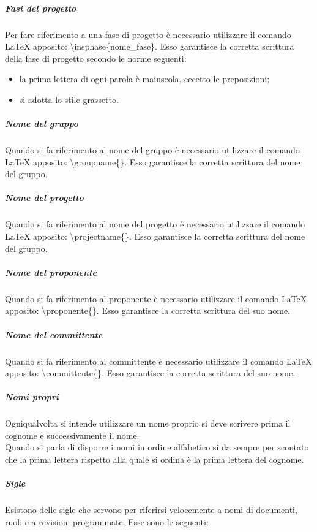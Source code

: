 				\subparagraph{Fasi del progetto}
					Per fare riferimento a una fase di progetto è necessario utilizzare il comando \LaTeX{} apposito: \textbackslash insphase\{nome\_fase\}. Esso garantisce la corretta scrittura della fase di progetto secondo le norme seguenti:
					\begin{itemize}
						\item la prima lettera di ogni parola è maiuscola, eccetto le preposizioni;
						\item si adotta lo stile grassetto.
					\end{itemize}
				\subparagraph{Nome del gruppo}
					Quando si fa riferimento al nome del gruppo è necessario utilizzare il comando \LaTeX{} apposito: \textbackslash groupname\{\}. Esso garantisce la corretta scrittura del nome del gruppo.
				\subparagraph{Nome del progetto}
					Quando si fa riferimento al nome del progetto è necessario utilizzare il comando \LaTeX{} apposito: \textbackslash projectname\{\}. Esso garantisce la corretta scrittura del nome del gruppo.
				\subparagraph{Nome del proponente}
					Quando si fa riferimento al proponente è necessario utilizzare il comando \LaTeX{} apposito: \textbackslash proponente\{\}. Esso garantisce la corretta scrittura del suo nome.
				\subparagraph{Nome del committente}
					Quando si fa riferimento al committente è necessario utilizzare il comando \LaTeX{} apposito: \textbackslash committente\{\}. Esso garantisce la corretta scrittura del suo nome.
				\subparagraph{Nomi propri}
					Ogniqualvolta si intende utilizzare un nome proprio si deve scrivere prima il cognome e successivamente il nome.\\
					Quando si parla di disporre i nomi in ordine alfabetico si da sempre per scontato che la prima lettera rispetto alla quale si ordina è la prima lettera del cognome.
				\subparagraph{Sigle}\label{sec:sigle}
					Esistono delle sigle che servono per riferirsi velocemente a nomi di documenti, ruoli e a revisioni programmate. Esse sono le seguenti:
